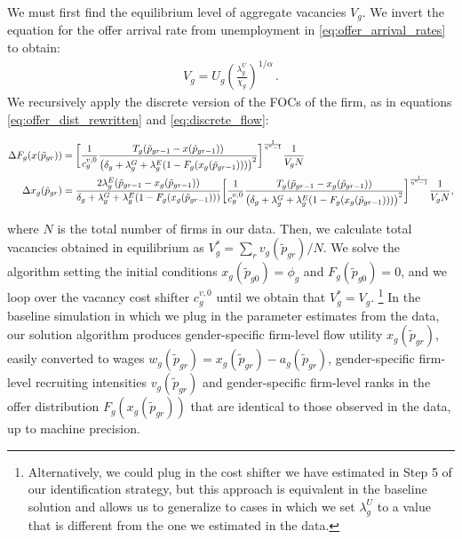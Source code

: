 We must first find the equilibrium level of aggregate vacancies $V_{g}$. We invert the equation for the offer arrival rate from unemployment in \eqref{eq:offer_arrival_rates} to obtain:
%
\begin{align}
    V_{g} =  U_{g} \left( \frac{\lambda_{g}^U}{\chi_{g}} \right)^{1/\alpha} \, .
\end{align}
%
We recursively apply the discrete version of the FOCs of the firm, as in equations \eqref{eq:offer_dist_rewritten} and \eqref{eq:discrete_flow}:
%
\begin{small}
    \begin{align}
        \Delta F_{g}(x(\tilde{p}_{gr})) & = \biggl{[} \frac{1}{c_{g}^{v,0}}
        \frac{T_{g} (\tilde{p}_{gr-1} - x(\tilde{p}_{gr-1}))}{\left(\delta_{g} + \lambda_{g}^{G} + \lambda_{g}^{E} (1 - F_{g}(x_{g}(\tilde{p}_{gr-1}))) \right)^{2}} \biggr{]}^{\frac{1}{\eta^{v}-1}}  \frac{1}{V_{g} N} \\
        \Delta x_{g}(\tilde{p}_{gr}) &= \frac{2 \lambda_{g}^{E} (\tilde{p}_{gr-1} - x_{g}(\tilde{p}_{gr-1}))}{\delta_{g} + \lambda_{g}^{G} + \lambda_{g}^{E} (1 - F_{g}(x_{g}(\tilde{p}_{gr-1})))}  \biggr{[} \frac{1}{c_{g}^{v,0}}
        \frac{T_{g} (\tilde{p}_{gr-1} - x_{g}(\tilde{p}_{gr-1}))}{\left(\delta_{g} + \lambda_{g}^{G} + \lambda_{g}^{E} (1 - F_{g}(x_{g}(\tilde{p}_{gr-1}))) \right)^{2}} \biggr{]}^{\frac{1}{\eta^{v}-1}} \frac{1}{V_{g} N},
    \end{align}
\end{small}
%
where $N$ is the total number of firms in our data.
%
Then, we calculate total vacancies obtained in equilibrium as $V_{g}^{\ast} = \sum_{r} v_{g}(\tilde{p}_{gr})/N$. We solve the algorithm setting the initial conditions $x_{g}(\tilde{p}_{g0}) = \phi_{g}$ and $F_{g}(\tilde{p}_{g0}) = 0$, and we loop over the vacancy cost shifter $c_{g}^{v,0}$ until we obtain that $V_{g}^{\ast} = V_{g}$.%
%
\footnote{Alternatively, we could plug in the cost shifter we have estimated in Step 5 of our identification strategy, but this approach is equivalent in the baseline solution and allows us to generalize to cases in which we set $\lambda_{g}^{U}$ to a value that is different from the one we estimated in the data.}
%
In the baseline simulation in which we plug in the parameter estimates from the data, our solution algorithm produces gender-specific firm-level flow utility $x_{g}(\tilde{p}_{gr})$, easily converted to wages $w_{g}(\tilde{p}_{gr}) = x_{g}(\tilde{p}_{gr}) - a_{g}(\tilde{p}_{gr})$, gender-specific firm-level recruiting intensities $v_{g}(\tilde{p}_{gr})$ and gender-specific firm-level ranks in the offer distribution $F_{g}(x_{g}(\tilde{p}_{gr}))$ that are identical to those observed in the data, up to machine precision.

